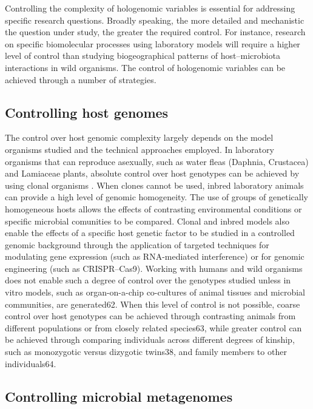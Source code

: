 \documentclass[
]{book}
\begin{document}
Controlling the complexity of hologenomic variables is essential for addressing specific research questions. Broadly speaking, the more detailed and mechanistic the question under study, the greater the required control. For instance, research on specific biomolecular processes using laboratory models will require a higher level of control than studying biogeographical patterns of host--microbiota interactions in wild organisms. The control of hologenomic variables can be achieved through a number of strategies.

\hypertarget{controlling-host-genomes}{%
\subsection{Controlling host genomes}\label{controlling-host-genomes}}

The control over host genomic complexity largely depends on the model organisms studied and the technical approaches employed. In laboratory organisms that can reproduce asexually, such as water fleas (Daphnia, Crustacea) and Lamiaceae plants, absolute control over host genotypes can be achieved by using clonal organisms \citep{Mushegian2019-md}. When clones cannot be used, inbred laboratory animals can provide a high level of genomic homogeneity. The use of groups of genetically homogeneous hosts allows the effects of contrasting environmental conditions or specific microbial comunities to be compared. Clonal and inbred models also enable the effects of a specific host genetic factor to be studied in a controlled genomic background through the application of targeted techniques for modulating gene expression (such as RNA-mediated interference) or for genomic engineering (such as CRISPR--Cas9). Working with humans and wild organisms does not enable such a degree of control over the genotypes studied unless in vitro models, such as organ-on-a-chip co-cultures of animal tissues and microbial communities, are generated62. When this level of control is not possible, coarse control over host genotypes can be achieved through contrasting animals from different populations or from closely related species63, while greater control can be achieved through comparing individuals across different degrees of kinship, such as monozygotic versus dizygotic twins38, and family members to other individuals64.

\hypertarget{controlling-microbial-metagenomes}{%
\subsection{Controlling microbial metagenomes}\label{controlling-microbial-metagenomes}}
\end{document}
